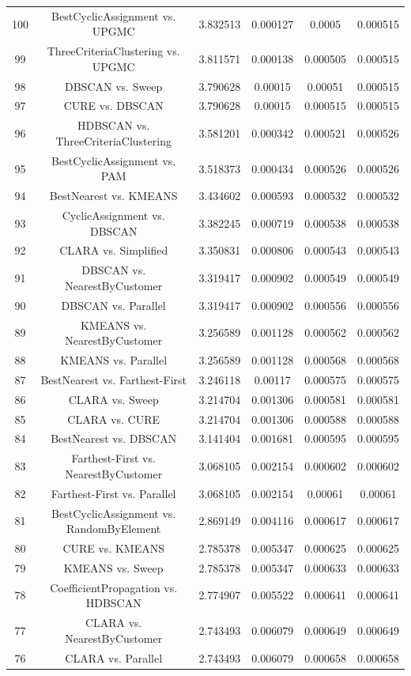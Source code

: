 \documentclass[a4paper,10pt]{article}
\begin{document}
\begin{landscape}
\begin{table}[!htp]
\begin{tabular}{cccccc}
100&BestCyclicAssignment vs. UPGMC&3.832513&0.000127&0.0005&0.000515\\
99&ThreeCriteriaClustering vs. UPGMC&3.811571&0.000138&0.000505&0.000515\\
98&DBSCAN vs. Sweep&3.790628&0.00015&0.00051&0.000515\\
97&CURE vs. DBSCAN&3.790628&0.00015&0.000515&0.000515\\
96&HDBSCAN vs. ThreeCriteriaClustering&3.581201&0.000342&0.000521&0.000526\\
95&BestCyclicAssignment vs. PAM&3.518373&0.000434&0.000526&0.000526\\
94&BestNearest vs. KMEANS&3.434602&0.000593&0.000532&0.000532\\
93&CyclicAssignment vs. DBSCAN&3.382245&0.000719&0.000538&0.000538\\
92&CLARA vs. Simplified&3.350831&0.000806&0.000543&0.000543\\
91&DBSCAN vs. NearestByCustomer&3.319417&0.000902&0.000549&0.000549\\
90&DBSCAN vs. Parallel&3.319417&0.000902&0.000556&0.000556\\
89&KMEANS vs. NearestByCustomer&3.256589&0.001128&0.000562&0.000562\\
88&KMEANS vs. Parallel&3.256589&0.001128&0.000568&0.000568\\
87&BestNearest vs. Farthest-First&3.246118&0.00117&0.000575&0.000575\\
86&CLARA vs. Sweep&3.214704&0.001306&0.000581&0.000581\\
85&CLARA vs. CURE&3.214704&0.001306&0.000588&0.000588\\
84&BestNearest vs. DBSCAN&3.141404&0.001681&0.000595&0.000595\\
83&Farthest-First vs. NearestByCustomer&3.068105&0.002154&0.000602&0.000602\\
82&Farthest-First vs. Parallel&3.068105&0.002154&0.00061&0.00061\\
81&BestCyclicAssignment vs. RandomByElement&2.869149&0.004116&0.000617&0.000617\\
80&CURE vs. KMEANS&2.785378&0.005347&0.000625&0.000625\\
79&KMEANS vs. Sweep&2.785378&0.005347&0.000633&0.000633\\
78&CoefficientPropagation vs. HDBSCAN&2.774907&0.005522&0.000641&0.000641\\
77&CLARA vs. NearestByCustomer&2.743493&0.006079&0.000649&0.000649\\
76&CLARA vs. Parallel&2.743493&0.006079&0.000658&0.000658\\

\end{tabular}
\end{table}
\end{landscape}
\end{document}
